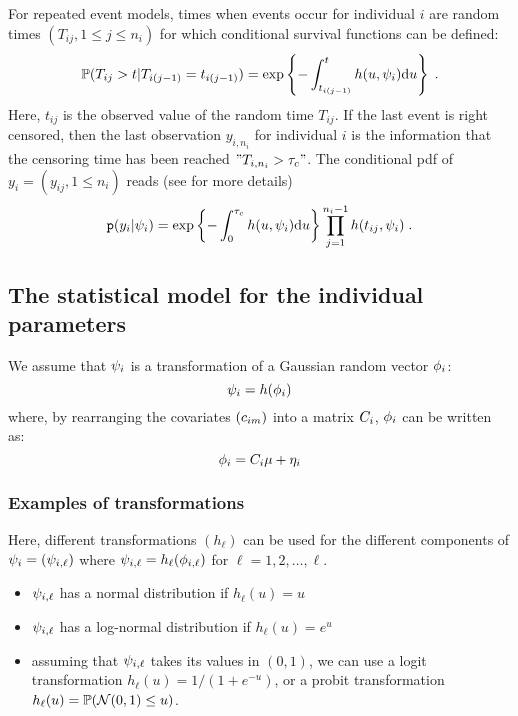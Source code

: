 For repeated event models, times when events occur for individual $i$ are random times $(T_{ij}, 1\leq j \leq n_i)$  for which conditional survival functions can be defined:
\begin{equation}
\mathbb{P}(T_{ij} > t|T_{i(j-1)}=t_{i(j-1)}) = \exp\left\{-\int_{t_{i(j-1)}}^{t}h(u, \psi_i)\textrm{d}u\right\}\;.
\end{equation}
Here, $t_{ij}$ is the observed value of the random time $T_{ij}$.
If the last event is right censored, then the last observation $y_{i,n_i}$ for individual $i$ is the information that the censoring time has been reached $"T_{i,n_i} > \tau_c"$. The conditional pdf of $y_i = (y_{ij},1\leq n_i)$ reads (see \cite{Lavielle14} for more details)
\begin{equation} \label{pdf_tte}
\texttt{p}(y_i |\psi_i) = \exp\left\{-\int_{0}^{\tau_c}h(u, \psi_i)\textrm{d}u \right\} \prod_{j=1}^{n_i-1} h(t_{ij},\psi_i)\;.
\end{equation}

\subsection{The statistical model for the individual parameters} \label{section_model_indiv}

We assume that ${\psi_i}$ is a transformation of a Gaussian random vector ${{\phi}_i}$:
\begin{equation} \label{prior2}
{\psi_i}=h({{\phi}_i})
\end{equation}
where, by rearranging the covariates $(c_{im})$ into a matrix $C_i$, ${{\phi}_i}$ can be written as:
\begin{equation} \label{prior3}
\phigi=\Covariate_i \fixed_effect + \etagi
\end{equation}

\subsubsection{Examples of transformations}
Here, different transformations $(h_\ell)$ can be used for the different components of ${\psi_i}=({\psi_{i,\ell}})$ where ${\psi_{i,\ell}}=h_\ell({{\phi}_{i,\ell}})$ for $\ell=1, 2, \ldots , \ell$.
\begin{itemize}
\item ${\psi_{i,\ell}}$ has a normal distribution if $h_\ell(u)=u$
\item ${\psi_{i,\ell}}$ has a log-normal distribution if $h_\ell(u)=e^u$
\item assuming that ${\psi_{i,\ell}}$ takes its values in $(0,1)$, we can use a logit transformation $h_\ell(u)=1/(1+e^{-u})$, or a probit transformation $h_\ell(u)=\mathbb{P}\!\left({\cal N}(0,1)\leq u\right)$.
\end{itemize}

